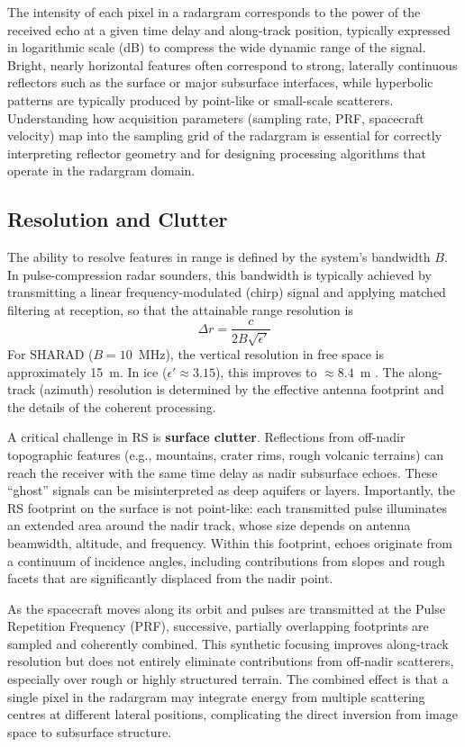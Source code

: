 The intensity of each pixel in a radargram corresponds to the power of the received echo at a given time delay and along-track position, typically expressed in logarithmic scale (dB) to compress the wide dynamic range of the signal. Bright, nearly horizontal features often correspond to strong, laterally continuous reflectors such as the surface or major subsurface interfaces, while hyperbolic patterns are typically produced by point-like or small-scale scatterers.
Understanding how acquisition parameters (sampling rate, PRF, spacecraft velocity) map into the sampling grid of the radargram is essential for correctly interpreting reflector geometry and for designing processing algorithms that operate in the radargram domain.

\subsection{Resolution and Clutter}
The ability to resolve features in range is defined by the system's bandwidth $B$.
In pulse-compression radar sounders, this bandwidth is typically achieved by transmitting a linear frequency-modulated (chirp) signal and applying matched filtering at reception, so that the attainable range resolution is
\begin{equation}
    \Delta r = \frac{c}{2B\sqrt{\epsilon'}}
\end{equation}
For SHARAD ($B = 10$~MHz), the vertical resolution in free space is approximately 15~m.
In ice ($\epsilon' \approx 3.15$), this improves to $\approx 8.4$~m \cite{Seu_2007}.
The along-track (azimuth) resolution is determined by the effective antenna footprint and the details of the coherent processing.

A critical challenge in RS is \textbf{surface clutter}.
Reflections from off-nadir topographic features (e.g., mountains, crater rims, rough volcanic terrains) can reach the receiver with the same time delay as nadir subsurface echoes.
These \enquote{ghost} signals can be misinterpreted as deep aquifers or layers.
Importantly, the RS footprint on the surface is not point-like: each transmitted pulse illuminates an extended area around the nadir track, whose size depends on antenna beamwidth, altitude, and frequency.
Within this footprint, echoes originate from a continuum of incidence angles, including contributions from slopes and rough facets that are significantly displaced from the nadir point.

As the spacecraft moves along its orbit and pulses are transmitted at the Pulse Repetition Frequency (PRF), successive, partially overlapping footprints are sampled and coherently combined.
This synthetic focusing improves along-track resolution but does not entirely eliminate contributions from off-nadir scatterers, especially over rough or highly structured terrain.
The combined effect is that a single pixel in the radargram may integrate energy from multiple scattering centres at different lateral positions, complicating the direct inversion from image space to subsurface structure.

